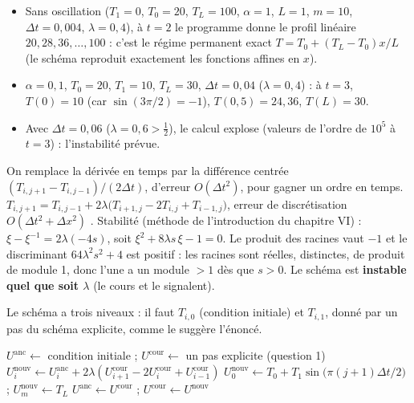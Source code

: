 
\Verif
\begin{itemize}
  \item Sans oscillation ($T_1 = 0$, $T_0 = 20$, $T_L = 100$, $\alpha = 1$,
        $L = 1$, $m = 10$, $\Delta t = 0{,}004$, $\lambda = 0{,}4$), à $t = 2$ le
        programme donne le profil linéaire $20, 28, 36, \dots, 100$ : c'est le
        régime permanent exact $T = T_0 + (T_L - T_0)x/L$ (le schéma reproduit
        exactement les fonctions affines en $x$).
  \item $\alpha = 0{,}1$, $T_0 = 20$, $T_1 = 10$, $T_L = 30$, $\Delta t = 0{,}04$
        ($\lambda = 0{,}4$) : à $t = 3$, $T(0) = 10$ (car $\sin(3\pi/2) = -1$),
        $T(0{,}5) = 24{,}36$, $T(L) = 30$.
  \item Avec $\Delta t = 0{,}06$ ($\lambda = 0{,}6 > \frac12$), le calcul explose
        (valeurs de l'ordre de $10^{5}$ à $t = 3$) : l'instabilité prévue.
\end{itemize}

\Pourquoi On remplace la dérivée en temps par la différence centrée
$(T_{i,j+1} - T_{i,j-1})/(2\Delta t)$, d'erreur $O(\Delta t^2)$, pour gagner un
ordre en temps.
\Etapes
{} $T_{i,j+1} = T_{i,j-1} + 2\lambda\bigl(T_{i+1,j} - 2T_{i,j} + T_{i-1,j}\bigr)$,
erreur de discrétisation $O(\Delta t^2 + \Delta x^2)$ .
 Stabilité (méthode de l'introduction du chapitre VI) :
$\xi - \xi^{-1} = 2\lambda(-4s)$, soit $\xi^2 + 8\lambda s\,\xi - 1 = 0$. Le
produit des racines vaut $-1$ et le discriminant $64\lambda^2s^2 + 4$ est
positif : les racines sont réelles, distinctes, de produit de module 1, donc
l'une a un module $> 1$ dès que $s > 0$. Le schéma est
\textbf{instable quel que soit $\lambda$} (le cours et  le
signalent).

\Pourquoi Le schéma a trois niveaux : il faut $T_{i,0}$ (condition initiale) et
$T_{i,1}$, donné par un pas du schéma explicite, comme le suggère l'énoncé.
\begin{algo}[ : Richardson]
  \State $U^{\text{anc}} \leftarrow$ condition initiale ; $U^{\text{cour}} \leftarrow$ un pas explicite (question 1)
      \State $U^{\text{nouv}}_i \leftarrow U^{\text{anc}}_i + 2\lambda(U^{\text{cour}}_{i+1} - 2U^{\text{cour}}_i + U^{\text{cour}}_{i-1})$
    \EndFor
    \State $U^{\text{nouv}}_0 \leftarrow T_0 + T_1\sin\bigl(\pi(j+1)\Delta t/2\bigr)$ ; $U^{\text{nouv}}_m \leftarrow T_L$
    \State $U^{\text{anc}} \leftarrow U^{\text{cour}}$ ; $U^{\text{cour}} \leftarrow U^{\text{nouv}}$
  \EndFor
\end{algo}

